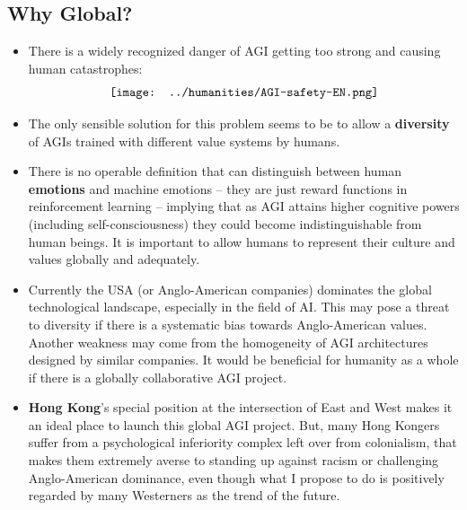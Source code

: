 \begin{preview}
\begin{minipage}{\textwidth}
\setlength{\parskip}{0.4\baselineskip}
		
\section{Why Global?}

\begin{itemize}
	\item There is a widely recognized danger of AGI getting too strong and causing human catastrophes:
	\begin{equation}
	\nonumber
	\vcenter{\hbox{\texttt{[image: ../humanities/AGI-safety-EN.png]}}}
	\end{equation}

	\item The only sensible solution for this problem seems to be to allow a \textbf{diversity} of AGIs trained with different value systems by humans.

	\item There is no operable definition that can distinguish between human \textbf{emotions} and machine emotions -- they are just reward functions in reinforcement learning -- implying that as AGI attains higher cognitive powers (including self-consciousness) they could become indistinguishable from human beings.  It is important to allow humans to represent their culture and values globally and adequately.

	\item Currently the USA (or Anglo-American companies) dominates the global technological landscape, especially in the field of AI.  This may pose a threat to diversity if there is a systematic bias towards Anglo-American values.  Another weakness may come from the homogeneity of AGI architectures designed by similar companies.  It would be beneficial for humanity as a whole if there is a globally collaborative AGI project.

	\item \textbf{Hong Kong}'s special position at the intersection of East and West makes it an ideal place to launch this global AGI project.  But, many Hong Kongers suffer from a psychological inferiority complex left over from colonialism, that makes them extremely averse to standing up against racism or challenging Anglo-American dominance, even though what I propose to do is positively regarded by many Westerners as the trend of the future.

\end{itemize}

\end{minipage}
\end{preview}


